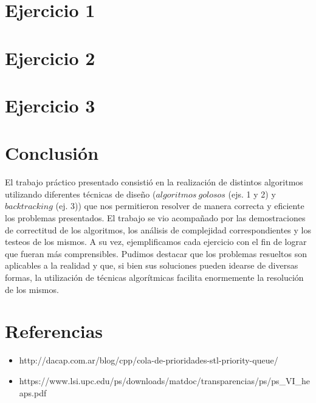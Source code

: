 \documentclass[10pt, a4paper]{article}
\begin{document}
\section{Ejercicio 1}

\newpage

\section{Ejercicio 2}

\newpage

\section{Ejercicio 3}

\newpage

\section{Conclusión}

El trabajo práctico presentado consistió en la realización de distintos algoritmos utilizando diferentes técnicas de diseño ($algoritmos\ golosos$ (ejs. 1 y 2) y $backtracking$ (ej. 3)) que nos permitieron resolver de manera correcta y eficiente los problemas presentados. El trabajo se vio acompañado por las demostraciones de correctitud de los algoritmos, los análisis de complejidad correspondientes y los testeos de los mismos. A su vez, ejemplificamos cada ejercicio con el fin de lograr que fueran más comprensibles.\newline
\newline
Pudimos destacar que los problemas resueltos son aplicables a la realidad y que, si bien sus soluciones pueden idearse de diversas formas, la utilización de técnicas algorítmicas facilita enormemente la resolución de los mismos.


\section{Referencias}

\begin{itemize}
\item http://dacap.com.ar/blog/cpp/cola-de-prioridades-stl-priority-queue/

\item https://www.lsi.upc.edu/ps/downloads/matdoc/transparencias/ps/ps\_VI\_heaps.pdf
\end{itemize}
\end{document}
